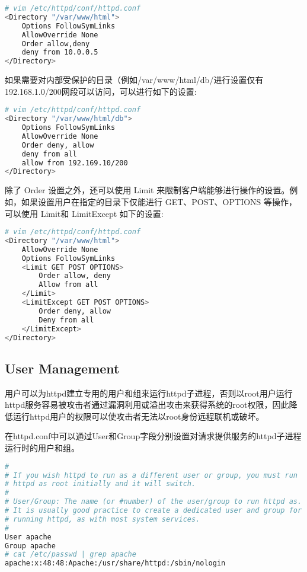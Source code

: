 \begin{lstlisting}[language=bash]
# vim /etc/httpd/conf/httpd.conf
<Directory "/var/www/html">
	Options FollowSymLinks
	AllowOverride None
	Order allow,deny
	deny from 10.0.0.5
</Directory>
\end{lstlisting}

如果需要对内部受保护的目录（例如/var/www/html/db/进行设置仅有 192.168.1.0/200网段可以访问，可以进行如下的设置:




\begin{lstlisting}[language=bash]
# vim /etc/httpd/conf/httpd.conf
<Directory "/var/www/html/db">
	Options FollowSymLinks
	AllowOverride None
	Order deny, allow
	deny from all
	allow from 192.169.10/200
</Directory>
\end{lstlisting}

除了 Order 设置之外，还可以使用 Limit 来限制客户端能够进行操作的设置。例如，如果设置用户在指定的目录下仅能进行 GET、POST、OPTIONS 等操作，可以使用 Limit和 LimitExcept 如下的设置:


\begin{lstlisting}[language=bash]
# vim /etc/httpd/conf/httpd.conf
<Directory "/var/www/html">
	AllowOverride None
	Options FollowSymLinks
	<Limit GET POST OPTIONS>
		Order allow, deny
		Allow from all
	</Limit>
	<LimitExcept GET POST OPTIONS>
		Order deny, allow
		Deny from all
	</LimitExcept>
</Directory>
\end{lstlisting}

\subsection{User Management}

用户可以为httpd建立专用的用户和组来运行httpd子进程，否则以root用户运行httpd服务容易被攻击者通过漏洞利用或溢出攻击来获得系统的root权限，因此降低运行httpd用户的权限可以使攻击者无法以root身份远程联机或破坏。

在httpd.conf中可以通过User和Group字段分别设置对请求提供服务的httpd子进程运行时的用户和组。

\begin{lstlisting}[language=bash]
#
# If you wish httpd to run as a different user or group, you must run
# httpd as root initially and it will switch.  
#
# User/Group: The name (or #number) of the user/group to run httpd as.
# It is usually good practice to create a dedicated user and group for
# running httpd, as with most system services.
#
User apache
Group apache
# cat /etc/passwd | grep apache
apache:x:48:48:Apache:/usr/share/httpd:/sbin/nologin
\end{lstlisting}





